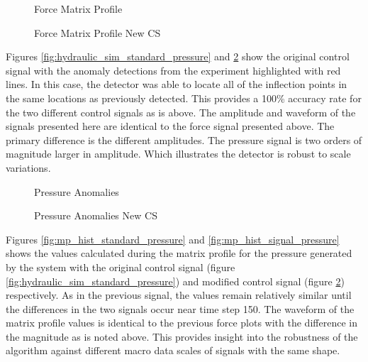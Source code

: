 \begin{figure}[H]
    \begin{minipage}[t]{0.5\linewidth}
        \centering
        \resizebox{\linewidth}{!}{}
        \caption{Force Matrix Profile}
        \label{fig:mp_hist_standard_force}
    \end{minipage}
    \begin{minipage}[t]{0.5\linewidth}
        \centering
        \resizebox{\linewidth}{!}{}
        \caption{Force Matrix Profile New CS}
        \label{fig:mp_hist_signal_force}
    \end{minipage}
\end{figure}

Figures \ref{fig:hydraulic_sim_standard_pressure} and \ref{fig:hydraulic_sim_signal_pressure} show the original control signal with the anomaly detections from the experiment highlighted with red lines. In this case, the detector was able to locate all of the inflection points in the same locations as previously detected. This provides a 100\% accuracy rate for the two different control signals as is above. The amplitude and waveform of the signals presented here are identical to the force signal presented above. The primary difference is the different amplitudes. The pressure signal is two orders of magnitude larger in amplitude. Which illustrates the detector is robust to scale variations. 

\begin{figure}[H]
    \begin{minipage}[t]{0.5\linewidth}
        \centering
        \resizebox{\linewidth}{!}{}
        \caption{Pressure Anomalies}
        \label{fig:hydraulic_sim_standard_pressure}
    \end{minipage}
    \begin{minipage}[t]{0.5\linewidth}
        \centering
        \resizebox{\linewidth}{!}{}
        \caption{Pressure Anomalies New CS}
        \label{fig:hydraulic_sim_signal_pressure}
    \end{minipage}
\end{figure}

Figures \ref{fig:mp_hist_standard_pressure} and \ref{fig:mp_hist_signal_pressure} shows the values calculated during the matrix profile for the pressure generated by the system with the original control signal (figure \ref{fig:hydraulic_sim_standard_pressure}) and modified control signal (figure \ref{fig:hydraulic_sim_signal_pressure}) respectively. As in the previous signal, the values remain relatively similar until the differences in the two signals occur near time step 150. The waveform of the matrix profile values is identical to the previous force plots with the difference in the magnitude as is noted above. This provides insight into the robustness of the algorithm against different macro data scales of signals with the same shape.

